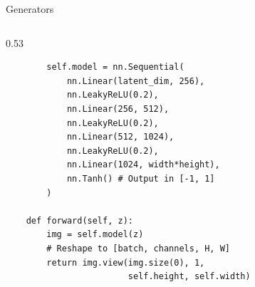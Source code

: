 \documentclass[aspectratio=169,xcolor=dvipsnames,svgnames,x11names,fleqn]{beamer}
\begin{document}
\begin{frame}[fragile]{Generators}
\begin{columns}[T]
\begin{column}{0.53\textwidth}
\begin{tcolorbox}[enhanced, boxrule=0.5pt, colback=pink!5, colframe=pink!50!black, title=PyTorch Implementation, fonttitle=\bfseries\small]
\begin{verbatim}
        self.model = nn.Sequential(
            nn.Linear(latent_dim, 256),
            nn.LeakyReLU(0.2),
            nn.Linear(256, 512),
            nn.LeakyReLU(0.2),
            nn.Linear(512, 1024),
            nn.LeakyReLU(0.2),
            nn.Linear(1024, width*height),
            nn.Tanh() # Output in [-1, 1]
        )
    
    def forward(self, z):
        img = self.model(z)
        # Reshape to [batch, channels, H, W]
        return img.view(img.size(0), 1, 
                        self.height, self.width)
                \end{verbatim}
            \end{tcolorbox}
        \end{column}
    \end{columns}
\end{frame}
\end{document}
